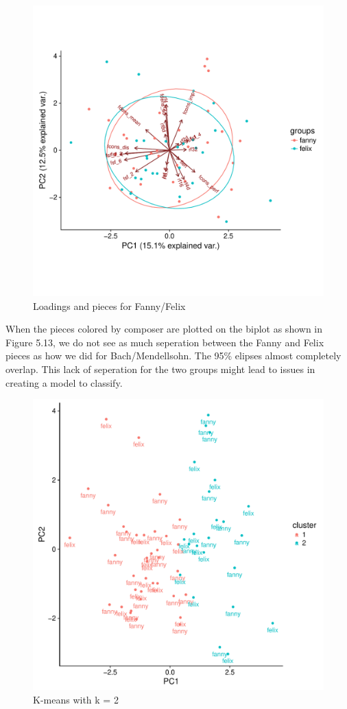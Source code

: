 \documentclass[12pt,twoside]{reedthesis}
\theoremstyle{definition}
\theoremstyle{definition}
\theoremstyle{definition}
\theoremstyle{remark}
\begin{document}
\begin{figure}[H]
\centering
\includegraphics[scale = .5]{images/bi_elipse_12_f.pdf}
\caption{Loadings and pieces for Fanny/Felix}
\label{subd}
\end{figure}
When the pieces colored by composer are plotted on the biplot as shown
in Figure 5.13, we do not see as much seperation between the Fanny and
Felix pieces as how we did for Bach/Mendellsohn. The 95\% elipses almost
completely overlap. This lack of seperation for the two groups might
lead to issues in creating a model to classify.
\begin{figure}[H]
\centering
\includegraphics[scale = .5]{images/kmeans_2_f.pdf}
\caption{K-means with k = 2}
\label{subd}
\end{figure}
\end{document}
